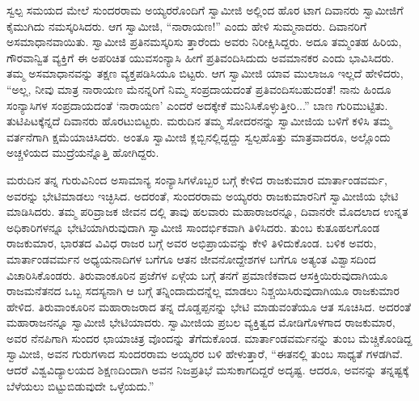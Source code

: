 ಸ್ವಲ್ಪ ಸಮಯದ ಮೇಲೆ ಸುಂದರರಾಮ ಅಯ್ಯರರೊಂದಿಗೆ ಸ್ವಾಮೀಜಿ ಅಲ್ಲಿಂದ ಹೊರ ಟಾಗ ದಿವಾನರು ಸ್ವಾಮೀಜಿಗೆ ಕೈಮುಗಿದು ನಮಸ್ಕರಿಸಿದರು. ಆಗ ಸ್ವಾಮೀಜಿ, “ನಾರಾಯಣ!” ಎಂದು ಹೇಳಿ ಸುಮ್ಮನಾದರು. ದಿವಾನರಿಗೆ ಅಸಮಾಧಾನವಾಯಿತು. ಸ್ವಾಮೀಜಿ ಪ್ರತಿನಮಸ್ಕರಿಸು ತ್ತಾರೆಂದು ಅವರು ನಿರೀಕ್ಷಿಸಿದ್ದರು. ಅದೂ ತಮ್ಮಂತಹ ಹಿರಿಯ, ಗೌರವಾನ್ವಿತ ವ್ಯಕ್ತಿಗೆ ಈ ಅಪರಿಚಿತ ಯುವಸಂನ್ಯಾಸಿ ಹೀಗೆ ಪ್ರತಿವಂದಿಸಿದುದು ಅವಮಾನಕರ ಎಂದು ಭಾವಿಸಿದರು. ತಮ್ಮ ಅಸಮಾಧಾನವನ್ನು ತಕ್ಷಣ ವ್ಯಕ್ತಪಡಿಸಿಯೂ ಬಿಟ್ಟರು. ಆಗ ಸ್ವಾಮೀಜಿ ಯಾವ ಮುಲಾಜೂ ಇಲ್ಲದೆ ಹೇಳಿದರು, “ಅಲ್ಲ, ನೀವು ಮಾತ್ರ ನಾರಾಯಣ ಮೆನನ್ನರಿಗೆ ನಿಮ್ಮ ಸಂಪ್ರದಾಯದಂತೆ ಪ್ರತಿವಂದಿಸಬಹುದಂತೆ! ನಾನು ಹಿಂದೂ ಸಂನ್ಯಾಸಿಗಳ ಸಂಪ್ರದಾಯದಂತೆ ‘ನಾರಾಯಣ’ ಎಂದರೆ ಅದಕ್ಕೇಕೆ ಮುನಿಸಿಕೊಳ್ಳುತ್ತೀರಿ...” ಬಾಣ ಗುರಿಮುಟ್ಟಿತು. ತುಟಿಪಿಟಕ್ಕೆನ್ನದೆ ದಿವಾನರು ಹೊರಟುಬಿಟ್ಟರು. ಮರುದಿನ ತಮ್ಮ ಸೋದರನನ್ನು ಸ್ವಾಮೀಜಿಯ ಬಳಿಗೆ ಕಳಿಸಿ ತಮ್ಮ ವರ್ತನೆಗಾಗಿ ಕ್ಷಮೆಯಾಚಿಸಿದರು. ಅಂತೂ ಸ್ವಾಮೀಜಿ ಕ್ಲಬ್ಬಿನಲ್ಲಿದ್ದದ್ದು ಸ್ವಲ್ಪಹೊತ್ತು ಮಾತ್ರವಾದರೂ, ಅಲ್ಲೊಂದು ಅಚ್ಚಳಿಯದ ಮುದ್ರೆಯನ್ನೊತ್ತಿ ಹೋಗಿದ್ದರು.

ಮರುದಿನ ತನ್ನ ಗುರುವಿನಿಂದ ಅಸಾಮಾನ್ಯ ಸಂನ್ಯಾಸಿಗಳೊಬ್ಬರ ಬಗ್ಗೆ ಕೇಳಿದ ರಾಜಕುಮಾರ ಮಾರ್ತಾಂಡವರ್ಮ, ಅವರನ್ನು ಭೇಟಿಮಾಡಲು ಇಚ್ಛಿಸಿದ. ಅದರಂತೆ, ಸುಂದರರಾಮ ಅಯ್ಯರರು ರಾಜಕುಮಾರನಿಗೆ ಸ್ವಾಮೀಜಿಯ ಭೇಟಿ ಮಾಡಿಸಿದರು. ತಮ್ಮ ಪರಿವ್ರಾಜಕ ಜೀವನ ದಲ್ಲಿ ತಾವು ಹಲವಾರು ಮಹಾರಾಜರನ್ನೂ, ದಿವಾನರೇ ಮೊದಲಾದ ಉನ್ನತ ಅಧಿಕಾರಿಗಳನ್ನೂ ಭೇಟಿಯಾಗಿರುವುದಾಗಿ ಸ್ವಾಮೀಜಿ ಸಾಂದರ್ಭಿಕವಾಗಿ ತಿಳಿಸಿದರು. ತುಂಬ ಕುತೂಹಲಗೊಂಡ ರಾಜಕುಮಾರ, ಭಾರತದ ವಿವಿಧ ರಾಜರ ಬಗ್ಗೆ ಅವರ ಅಭಿಪ್ರಾಯವನ್ನು ಕೇಳಿ ತಿಳಿದುಕೊಂಡ. ಬಳಿಕ ಅವರು, ಮಾರ್ತಾಂಡವರ್ಮನ ಅಧ್ಯಯನಾದಿಗಳ ಬಗೆಗೂ ಆತನ ಜೀವನೋದ್ದೇಶಗಳ ಬಗೆಗೂ ಅತ್ಯಂತ ವಿಶ್ವಾಸದಿಂದ ವಿಚಾರಿಸಿಕೊಂಡರು. ತಿರುವಾಂಕೂರಿನ ಪ್ರಜೆಗಳ ಏಳ್ಗೆಯ ಬಗ್ಗೆ ತನಗೆ ಪ್ರಮಾಣಿಕವಾದ ಆಸಕ್ತಿಯಿರುವುದಾಗಿಯೂ ರಾಜಮನೆತನದ ಒಬ್ಬ ಸದಸ್ಯನಾಗಿ ಆ ಬಗ್ಗೆ ತನ್ನಿಂದಾದುದನ್ನೆಲ್ಲ ಮಾಡಲು ನಿಶ್ಚಯಿಸಿರುವುದಾಗಿಯೂ ರಾಜಕುಮಾರ ಹೇಳಿದ. ತಿರುವಾಂಕೂರಿನ ಮಹಾರಾಜರಾದ ತನ್ನ ದೊಡ್ಡಪ್ಪನನ್ನು ಭೇಟಿ ಮಾಡುವಂತೆಯೂ ಆತ ಸೂಚಿಸಿದ. ಅದರಂತೆ ಮಹಾರಾಜನನ್ನೂ ಸ್ವಾಮೀಜಿ ಭೇಟಿಯಾದರು. ಸ್ವಾಮೀಜಿಯ ಪ್ರಬಲ ವ್ಯಕ್ತಿತ್ವದ ಮೋಡಿಗೊಳಗಾದ ರಾಜಕುಮಾರ, ಅವರ ನೆನಪಿಗಾಗಿ ಸುಂದರ ಛಾಯಾಚಿತ್ರ ವೊಂದನ್ನು ತೆಗೆದುಕೊಂಡ. ಮಾರ್ತಾಂಡವರ್ಮನನ್ನು ತುಂಬ ಮೆಚ್ಚಿಕೊಂಡಿದ್ದ ಸ್ವಾಮೀಜಿ, ಅವನ ಗುರುಗಳಾದ ಸುಂದರರಾಮ ಅಯ್ಯರರ ಬಳಿ ಹೇಳುತ್ತಾರೆ, “ಈತನಲ್ಲಿ ತುಂಬ ಸಾಧ್ಯತೆ ಗಳಡಗಿವೆ. ಆದರೆ ವಿಶ್ವವಿದ್ಯಾಲಯದ ಶಿಕ್ಷಣದಿಂದಾಗಿ ಅವನ ನಿಜಪ್ರತಿಭೆ ಮಸುಕಾಗದಿದ್ದರೆ ಅದೃಷ್ಟ. ಆದರೂ, ಅವನನ್ನು ತನ್ನಷ್ಟಕ್ಕೆ ಬೆಳೆಯಲು ಬಿಟ್ಟುಬಿಡುವುದೇ ಒಳ್ಳೆಯದು.”


